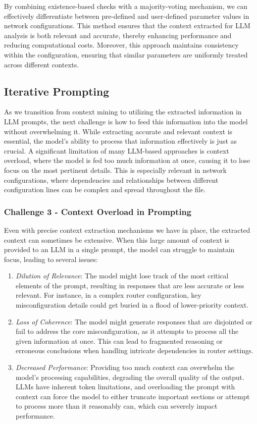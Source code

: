 By combining existence-based checks with a majority-voting mechanism, we can effectively differentiate between pre-defined and user-defined parameter values in network configurations. This method ensures that the context extracted for LLM analysis is both relevant and accurate, thereby enhancing performance and reducing computational costs. Moreover, this approach maintains consistency within the configuration, ensuring that similar parameters are uniformly treated across different contexts.


\subsection{Iterative Prompting}\label{mining_method}
As we transition from context mining to utilizing the extracted information in LLM prompts, the next challenge is how to feed this information into the model without overwhelming it. While extracting accurate and relevant context is essential, the model's ability to process that information effectively is just as crucial. A significant limitation of many LLM-based approaches is context overload, where the model is fed too much information at once, causing it to lose focus on the most pertinent details. This is especially relevant in network configurations, where dependencies and relationships between different configuration lines can be complex and spread throughout the file.

\subsubsection{Challenge 3 - Context Overload in Prompting}
\label{challenge_3}

Even with precise context extraction mechanisms we have in place, the extracted context can sometimes be extensive. When this large amount of context is provided to an LLM in a single prompt, the model can struggle to maintain focus, leading to several issues:
\begin{enumerate}
    \item \textit{Dilution of Relevance}: The model might lose track of the most critical elements of the prompt, resulting in responses that are less accurate or less relevant. For instance, in a complex router configuration, key misconfiguration details could get buried in a flood of lower-priority context.
    \item \textit{Loss of Coherence}: The model might generate responses that are disjointed or fail to address the core misconfiguration, as it attempts to process all the given information at once. This can lead to fragmented reasoning or erroneous conclusions when handling intricate dependencies in router settings.
    \item \textit{Decreased Performance}: Providing too much context can overwhelm the model’s processing capabilities, degrading the overall quality of the output. LLMs have inherent token limitations, and overloading the prompt with context can force the model to either truncate important sections or attempt to process more than it reasonably can, which can severely impact performance.
\end{enumerate}

